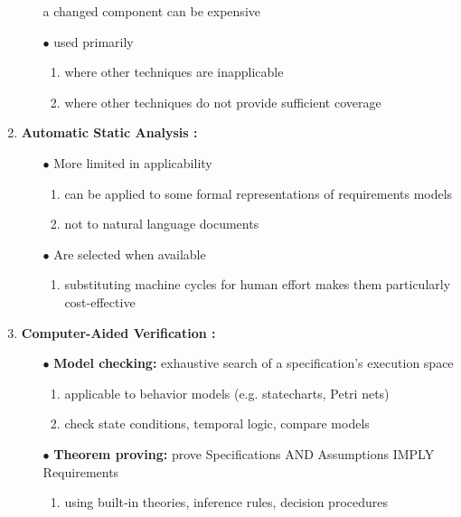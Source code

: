 \documentclass{article}
\begin{document}
\begin{enumerate}
\begin{itemize}
a
changed
component
can
be
expensive
        \item [$\bullet$]used
primarily
         \begin{enumerate}
            \item where
other
techniques
are
inapplicable
            \item where
other
techniques
do
not
provide
sufficient
coverage\\
        \end{enumerate}
    \end{itemize}
    \item \textbf{Automatic Static Analysis : }
    \begin{itemize}
        \item [$\bullet$]More
limited
in
applicability
\begin{enumerate}
    \item can
be
applied
to
some
formal
representations
of
requirements
models
    \item not
to
natural
language
documents
\end{enumerate}
        \item [$\bullet$]Are
selected
when
available
        \begin{enumerate}
    \item substituting
machine
cycles
for
human
effort
makes them
particularly
cost-effective\\
\end{enumerate}


    \end{itemize}
        \item \textbf{Computer-Aided
Verification : }
    \begin{itemize}
        \item [$\bullet$]\textbf{Model
checking:} exhaustive
search
of
a
specification's
execution
space
\begin{enumerate}
    \item applicable
to
behavior models
(e.g.
statecharts,
Petri
nets)
    \item check
state
conditions,
temporal
logic,
compare
models
\end{enumerate}
        \item [$\bullet$]\textbf{Theorem
proving:} prove
Specifications AND
Assumptions IMPLY
Requirements
        \begin{enumerate}
    \item using
built‐in
theories,
inference
rules,
decision
procedures\\
\end{enumerate}


\end{itemize}
\end{enumerate}
\end{document}
